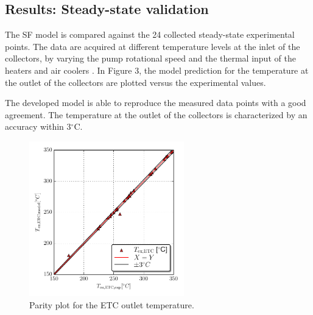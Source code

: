 \documentclass[final,3p,times,review]{elsarticle}
\begin{document}
%
\subsection{Results: Steady-state validation}
%
The SF model is compared against the 24 collected steady-state experimental points. The data are acquired at different temperature levels at the inlet of the collectors, by varying the pump rotational speed and the thermal input of the heaters and air coolers . In Figure 3, the model prediction for the temperature at the outlet of the collectors are plotted versus the experimental values.
%

%
The developed model is able to reproduce the measured data points with a good agreement. The temperature at the outlet of the collectors is characterized  by an accuracy within 3$^{\circ}$C.
\clearpage
\begin{figure}[h!]
	\centering
	\includegraphics[width=0.6\textwidth]{Figures/StSt_Validation.pdf}
	\caption{Parity plot for the ETC outlet temperature.}
	\label{fig:SF_ModModel}
\end{figure}
%
%
\end{document}
